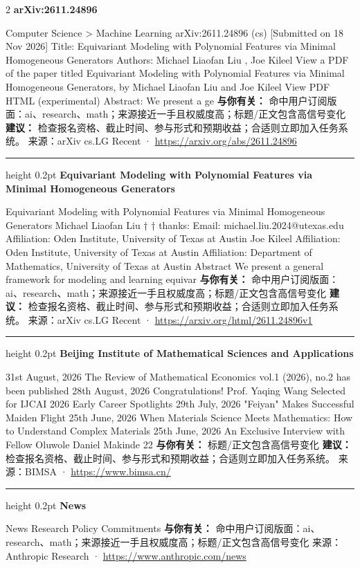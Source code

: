 \documentclass[10.5pt]{ctexart}
\begin{document}
\begin{multicols}{2}
{\large\bfseries arXiv:2611.24896}\par
Computer Science > Machine Learning arXiv:2611.24896 (cs) [Submitted on 18 Nov 2026] Title: Equivariant Modeling with Polynomial Features via Minimal Homogeneous Generators Authors: Michael Liaofan Liu , Joe Kileel View a PDF of the paper titled Equivariant Modeling with Polynomial Features via Minimal Homogeneous Generators, by Michael Liaofan Liu and Joe Kileel View PDF HTML (experimental) Abstract: We present a ge
\textbf{与你有关：} 命中用户订阅版面：ai、research、math；来源接近一手且权威度高；标题/正文包含高信号变化
\textbf{建议：} 检查报名资格、截止时间、参与形式和预期收益；合适则立即加入任务系统。
{\footnotesize\color{ormuted} 来源：arXiv cs.LG Recent · \url{https://arxiv.org/abs/2611.24896}}
\vspace{2mm}
\hrule height 0.2pt
\vspace{2mm}
{\large\bfseries Equivariant Modeling with Polynomial Features via Minimal Homogeneous Generators}\par
Equivariant Modeling with Polynomial Features via Minimal Homogeneous Generators Michael Liaofan Liu † † thanks: Email: michael.liu.2024@utexas.edu Affiliation: Oden Institute, University of Texas at Austin Joe Kileel Affiliation: Oden Institute, University of Texas at Austin Affiliation: Department of Mathematics, University of Texas at Austin Abstract We present a general framework for modeling and learning equivar
\textbf{与你有关：} 命中用户订阅版面：ai、research、math；来源接近一手且权威度高；标题/正文包含高信号变化
\textbf{建议：} 检查报名资格、截止时间、参与形式和预期收益；合适则立即加入任务系统。
{\footnotesize\color{ormuted} 来源：arXiv cs.LG Recent · \url{https://arxiv.org/html/2611.24896v1}}
\vspace{2mm}
\hrule height 0.2pt
\vspace{2mm}
{\large\bfseries Beijing Institute of Mathematical Sciences and Applications}\par
31st August, 2026 The Review of Mathematical Economics vol.1 (2026), no.2 has been published 28th August, 2026 Congratulations! Prof. Yaqing Wang Selected for IJCAI 2026 Early Career Spotlights 29th July, 2026 "Feiyan" Makes Successful Maiden Flight 25th June, 2026 When Materials Science Meets Mathematics: How to Understand Complex Materials 25th June, 2026 An Exclusive Interview with Fellow Oluwole Daniel Makinde 22
\textbf{与你有关：} 标题/正文包含高信号变化
\textbf{建议：} 检查报名资格、截止时间、参与形式和预期收益；合适则立即加入任务系统。
{\footnotesize\color{ormuted} 来源：BIMSA · \url{https://www.bimsa.cn/}}
\vspace{2mm}
\hrule height 0.2pt
\vspace{2mm}
{\large\bfseries News}\par
News Research Policy Commitments
\textbf{与你有关：} 命中用户订阅版面：ai、research、math；来源接近一手且权威度高；标题/正文包含高信号变化
{\footnotesize\color{ormuted} 来源：Anthropic Research · \url{https://www.anthropic.com/news}}
\end{multicols}
\end{document}
